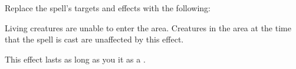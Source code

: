 Replace the spell's targets and effects with the following:
\begin{spellcontent}

\begin{augmenttargetinginfo}



\end{augmenttargetinginfo}


\begin{augmenteffects}



\spelleffect
Living creatures are unable to enter the area.
Creatures in the area at the time that the spell is cast are unaffected by this effect.

This effect lasts as long as you  it as a .






\end{augmenteffects}

\end{spellcontent}





